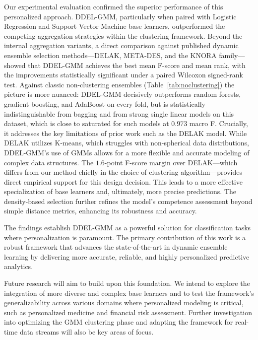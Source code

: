 \documentclass[lettersize,journal]{IEEEtran}
\begin{document}
	Our experimental evaluation confirmed the superior performance of this personalized approach. DDEL-GMM, particularly when paired with Logistic Regression and Support Vector Machine base learners, outperformed the competing aggregation strategies within the clustering framework. Beyond the internal aggregation variants, a direct comparison against published dynamic ensemble selection methods—DELAK, META-DES, and the KNORA family—showed that DDEL-GMM achieves the best mean F-score and mean rank, with the improvements statistically significant under a paired Wilcoxon signed-rank test. Against classic non-clustering ensembles (Table~\ref{tab:noclustering}) the picture is more nuanced: DDEL-GMM decisively outperforms random forests, gradient boosting, and AdaBoost on every fold, but is statistically indistinguishable from bagging and from strong single linear models on this dataset, which is close to saturated for such models at $0.973$ macro F. Crucially, it addresses the key limitations of prior work such as the DELAK model. While DELAK utilizes K-means, which struggles with non-spherical data distributions, DDEL-GMM's use of GMMs allows for a more flexible and accurate modeling of complex data structures. The $1.6$-point F-score margin over DELAK—which differs from our method chiefly in the choice of clustering algorithm—provides direct empirical support for this design decision. This leads to a more effective specialization of base learners and, ultimately, more precise predictions. The density-based selection further refines the model's competence assessment beyond simple distance metrics, enhancing its robustness and accuracy.
	
	The findings establish DDEL-GMM as a powerful solution for classification tasks where personalization is paramount. The primary contribution of this work is a robust framework that advances the state-of-the-art in dynamic ensemble learning by delivering more accurate, reliable, and highly personalized predictive analytics.
	
	Future research will aim to build upon this foundation. We intend to explore the integration of more diverse and complex base learners and to test the framework’s generalizability across various domains where personalized modeling is critical, such as personalized medicine and financial risk assessment. Further investigation into optimizing the GMM clustering phase and adapting the framework for real-time data streams will also be key areas of focus.
	
	
	
	
\end{document}
